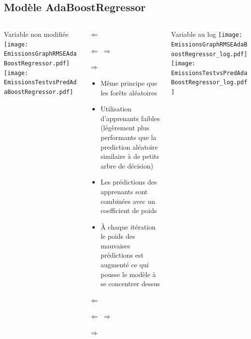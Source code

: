 \documentclass[8pt,aspectratio=169,hyperref={unicode=true}]{beamer}
\begin{document}
\subsection{Modèle AdaBoostRegressor}
\begin{frame}{\insertsubsection}
  \begin{columns}[t]
    \begin{column}{.33\textwidth}
      \centering Variable non modifiée
      \texttt{[image: EmissionsGraphRMSEAdaBoostRegressor.pdf]}
      \texttt{[image: EmissionsTestvsPredAdaBoostRegressor.pdf]}
    \end{column}
    \begin{column}{.33\textwidth}
      $\Longleftarrow$

      {\tiny
          }

      $\Longleftarrow$ \hfill $\Longrightarrow$

      \raggedleft
      {\tiny
        }

      $\Longrightarrow$

      \scriptsize
      \begin{itemize}
        \item Même principe que les forêts aléatoires
        \item Utilisation d'apprenants faibles (légèrement plus performants que la prediction aléatoire
              similaire à de petits arbre de décision)
        \item Les prédictions des apprenants sont combinées avec un coefficient de poids
        \item À chaque itération le poids des mauvaises prédictions est augmenté ce qui pousse le modèle
              à se concentrer dessus
      \end{itemize}

      \normalsize
      \raggedright
      $\Longleftarrow$

      {\tiny
          }

      $\Longleftarrow$ \hfill $\Longrightarrow$

      \raggedleft
      {\tiny
        
      }

      $\Longrightarrow$
    \end{column}
    \begin{column}{.33\textwidth}
      \centering Variable au log
      \texttt{[image: EmissionsGraphRMSEAdaBoostRegressor\_log.pdf]}
      \texttt{[image: EmissionsTestvsPredAdaBoostRegressor\_log.pdf]}
    \end{column}
  \end{columns}
\end{frame}
\end{document}

